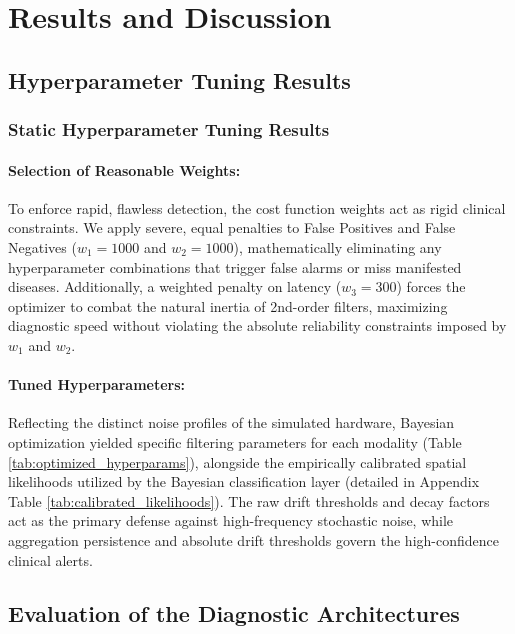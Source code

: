 \documentclass[sigconf]{acmart}
\begin{document}
\section{Results and Discussion}

\subsection{Hyperparameter Tuning Results}
\subsubsection{Static Hyperparameter Tuning Results}

\paragraph{Selection of Reasonable Weights:} To enforce rapid, flawless detection, the cost function weights act as rigid clinical constraints. We apply severe, equal penalties to False Positives and False Negatives ($w_1=1000$ and $w_2=1000$), mathematically eliminating any hyperparameter combinations that trigger false alarms or miss manifested diseases. Additionally, a weighted penalty on latency ($w_3=300$) forces the optimizer to combat the natural inertia of 2nd-order filters, maximizing diagnostic speed without violating the absolute reliability constraints imposed by $w_1$ and $w_2$.

\paragraph{Tuned Hyperparameters:}
Reflecting the distinct noise profiles of the simulated hardware, Bayesian optimization yielded specific filtering parameters for each modality (Table \ref{tab:optimized_hyperparams}), alongside the empirically calibrated spatial likelihoods utilized by the Bayesian classification layer (detailed in Appendix Table \ref{tab:calibrated_likelihoods}). The raw drift thresholds and decay factors act as the primary defense against high-frequency stochastic noise, while aggregation persistence and absolute drift thresholds govern the high-confidence clinical alerts.

\subsection{Evaluation of the Diagnostic Architectures}
\end{document}
